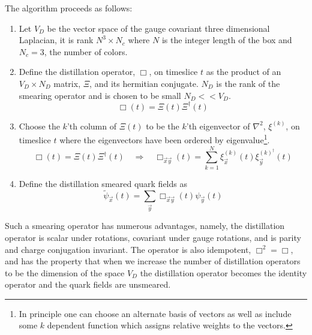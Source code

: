 
The algorithm proceeds as follows: 
\begin{enumerate}
\item Let $V_{D}$ be the vector space of the gauge covariant three dimensional Laplacian, it is rank $N^3\times N_c$ where $N$ is the integer length of the box and $N_c = 3$,  the number of colors.  
\item Define the distillation operator, $\Box$, on timeslice $t$ as the product of an $V_D\times N_D$ matrix, $\Xi$, and its hermitian conjugate. $N_D$ is the rank of the smearing operator and is chosen to be small $N_D << V_D$. 
\begin{equation*}
\Box(t) = \Xi(t) \Xi^\dagger(t)
\end{equation*}
\item Choose the $k$'th column of $\Xi(t)$ to be the $k$'th eigenvector of $\nabla^2$, $\xi^{(k)}$, on timeslice $t$ where the eigenvectors have been ordered by eigenvalue\footnote{In principle one can choose an alternate basis of vectors as well as include some $k$ dependent function which assigns relative weights to the vectors.}. 
\begin{equation*}
\Box(t) = \Xi(t) \Xi^\dagger(t) \quad \Longrightarrow \quad \Box_{\vec{x}\vec{y}}(t) = \sum_{k=1}^N \xi_{\vec{x}}^{(k)}(t)  \xi_{\vec{y}}^{(k)^\dagger}(t) 
\end{equation*}
\item Define the distillation smeared quark fields as
\begin{equation*}
\tilde{\psi}_{\vec{x}}(t) = \sum_{\vec{y}} \Box_{\vec{x}\vec{y}}(t) \psi_{\vec{y}}(t)
\end{equation*}
\end{enumerate}

Such a smearing operator has numerous advantages, namely, the distillation operator is scalar under rotations, covariant under gauge rotations, and is parity and charge conjugation invariant.  The operator is also idempotent, $\Box^2 = \Box$, and has the property that when we increase the number of distillation operators to be the dimension of the space $V_D$ the distillation operator becomes the identity operator and the quark fields are unsmeared. 

